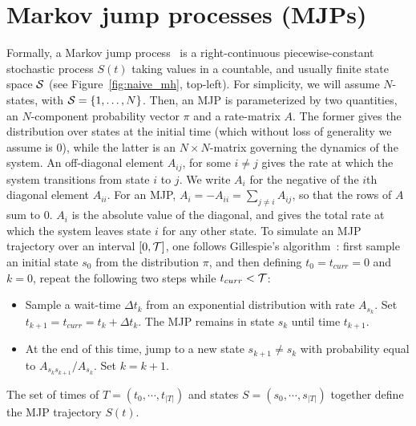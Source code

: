 \section{Markov jump processes (MJPs)} 
Formally, a Markov jump process~\cite{Cinlar1975} is a right-continuous 
piecewise-constant stochastic process $S(t)$ taking values in a countable, and 
usually finite state space ${\mathcal S}$ (see Figure~\ref{fig:naive_mh}, top-left).
For simplicity, we will assume $N$-states, with ${\mathcal S} = \{1,\ldots,N\}$. Then, 
an MJP is parameterized by two quantities, an $N$-component probability vector 
$\pi$ and a rate-matrix $A$. The former gives the distribution over states at 
the initial time (which without loss of generality we assume is $0$), while 
the latter is an $N \times N$-matrix governing the dynamics of the system.  An 
off-diagonal element $A_{ij}$, for some $i \neq j$ gives the rate at 
which the system transitions from state $i$ to $j$. We write $A_i$ for the 
negative of the $i$th diagonal element $A_{ii}$. For an MJP,
$A_i = -A_{ii} = \sum_{j \neq i} A_{ij}$, so that the rows of $A$ sum to $0$.  
$A_i$ is the absolute value of the diagonal,
and gives the total rate at which the system leaves state $i$ for any other state.
To simulate an MJP trajectory over an interval $[0,{\mathcal T}]$, one follows 
Gillespie's algorithm~\cite{gillespie97}: 
first sample an initial state $s_0$ from the distribution $\pi$, and
then defining $t_0 = t_{curr} = 0$ and $k = 0$, repeat the following two steps while
$t_{curr} < {\mathcal T}$:
\begin{itemize}
  \item Sample a wait-time $\Delta t_k$ from an exponential distribution with rate 
    $A_{s_k}$.  Set $t_{k+1} = t_{curr} = t_{k} + \Delta t_k$.
    The MJP remains in state $s_k$ until time $t_{k+1}$.
  \item At the end of this time, jump to a new state $s_{k+1} \neq s_k$ with 
    probability equal to $A_{s_ks_{k+1}}/A_{s_k}$. Set $k=k+1$.
\end{itemize}
The set of times of $T=(t_0, \cdots, t_{|T| })$ and states 
$S=(s_0, \cdots, s_{|T| })$ together define the MJP trajectory $S(t)$.

